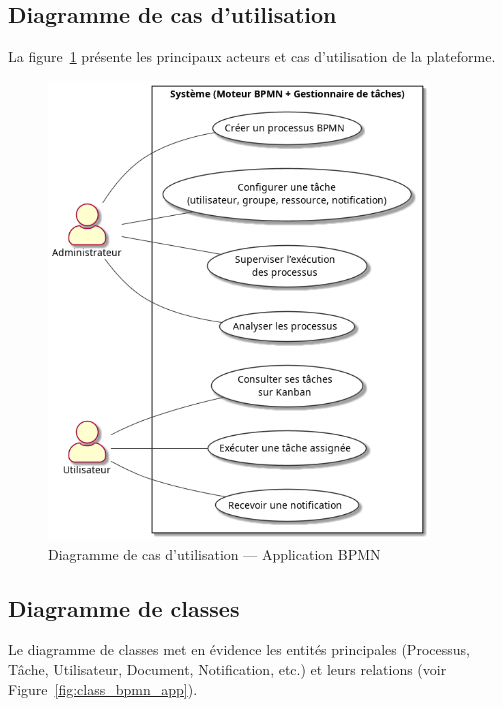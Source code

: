 \subsection{Diagramme de cas d’utilisation}
La figure~\ref{fig:uc_bpmn_app} présente les principaux acteurs et cas d'utilisation de la plateforme.  
\begin{figure}[h]
    \centering
    \includegraphics[width=0.9\textwidth]{Images/usecase.png}
    \caption{Diagramme de cas d'utilisation — Application BPMN}
    \label{fig:uc_bpmn_app}
\end{figure}

\subsection{Diagramme de classes}
Le diagramme de classes met en évidence les entités principales (Processus, Tâche, Utilisateur, Document, Notification, etc.) et leurs relations (voir Figure~\ref{fig:class_bpmn_app}).  

